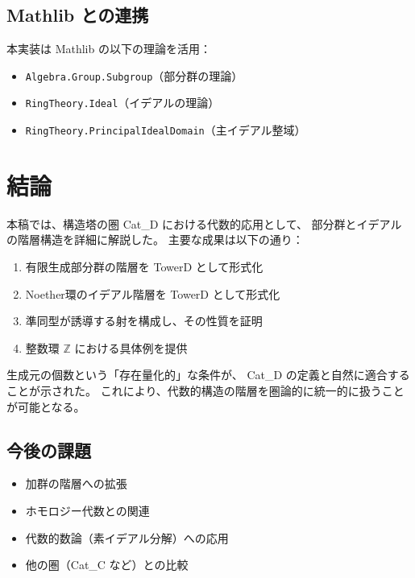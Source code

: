 \documentclass[a4paper,12pt]{ltjsarticle}
\theoremstyle{definition}
\begin{document}
\subsection{Mathlib との連携}

本実装は Mathlib の以下の理論を活用：
\begin{itemize}
  \item \texttt{Algebra.Group.Subgroup}（部分群の理論）
  \item \texttt{RingTheory.Ideal}（イデアルの理論）
  \item \texttt{RingTheory.PrincipalIdealDomain}（主イデアル整域）
\end{itemize}

\section{結論}

本稿では、構造塔の圏 Cat\_D における代数的応用として、
部分群とイデアルの階層構造を詳細に解説した。
主要な成果は以下の通り：

\begin{enumerate}
  \item 有限生成部分群の階層を TowerD として形式化
  \item Noether環のイデアル階層を TowerD として形式化
  \item 準同型が誘導する射を構成し、その性質を証明
  \item 整数環 $\mathbb{Z}$ における具体例を提供
\end{enumerate}

\begin{keypoint}
生成元の個数という「存在量化的」な条件が、
Cat\_D の定義と自然に適合することが示された。
これにより、代数的構造の階層を圏論的に統一的に扱うことが可能となる。
\end{keypoint}

\subsection{今後の課題}

\begin{itemize}
  \item 加群の階層への拡張
  \item ホモロジー代数との関連
  \item 代数的数論（素イデアル分解）への応用
  \item 他の圏（Cat\_C など）との比較
\end{itemize}
\end{document}
